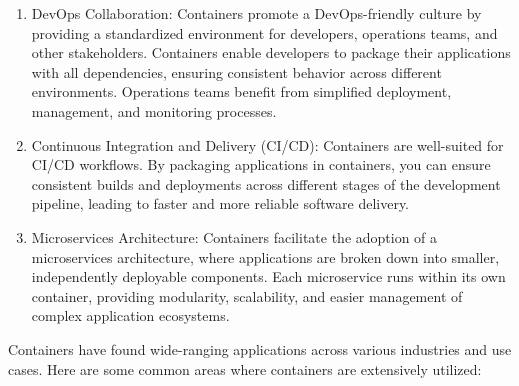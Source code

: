 \begin{enumerate}
    \item DevOps Collaboration: Containers promote a DevOps-friendly culture by providing a standardized environment for developers, operations teams, and other stakeholders. Containers enable developers to package their applications with all dependencies, ensuring consistent behavior across different environments. Operations teams benefit from simplified deployment, management, and monitoring processes.

    \item Continuous Integration and Delivery (CI/CD): Containers are well-suited for CI/CD workflows. By packaging applications in containers, you can ensure consistent builds and deployments across different stages of the development pipeline, leading to faster and more reliable software delivery.

    \item Microservices Architecture: Containers facilitate the adoption of a microservices architecture, where applications are broken down into smaller, independently deployable components. Each microservice runs within its own container, providing modularity, scalability, and easier management of complex application ecosystems.

\end{enumerate}

Containers have found wide-ranging applications across various industries and use cases. Here are some common areas where containers are extensively utilized:

